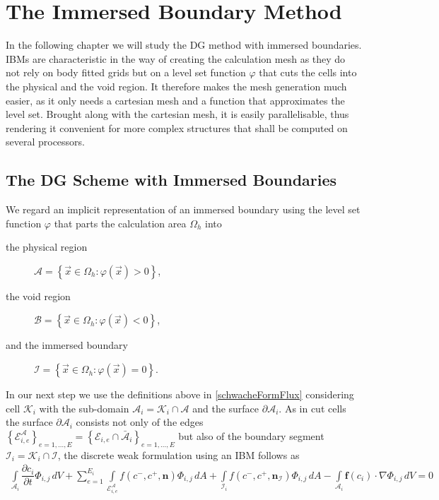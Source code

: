 \chapter{The Immersed Boundary Method}
\label{immersedBoundaries}
In the following chapter we will study the DG method with immersed boundaries. IBMs are characteristic in the way of creating the calculation mesh as they do not rely on body fitted grids but on a level set function $\varphi$ that cuts the cells into the physical and the void region. It therefore makes the mesh generation much easier, as it only needs a cartesian mesh and a function that approximates the level set. Brought along with the cartesian mesh, it is easily parallelisable, thus rendering it convenient for more complex structures that shall be computed on several processors.
	\section{The DG Scheme with Immersed Boundaries}
	We regard an implicit representation of an immersed boundary using the level set function $\varphi$ that parts the calculation area $\Omega_h$ into 
	\begin{description}
		\item[the physical region]  $\mathcal{A} = \left\{\vec{x} \in \Omega_h : \varphi (\vec{x}) > 0 \right\}$,
		\item[the void region]  $\mathcal{B} = \left\{ \vec{x}\in \Omega_h : \varphi (\vec{x}) < 0 \right\}$, 
		\item[and the immersed boundary] $\mathcal{I} = \left\{ \vec{x}\in \Omega_h : \varphi (\vec{x}) = 0 \right\}$.
	\end{description}
	In our next step we use the definitions above in \ref{schwacheFormFlux} considering cell $\mathcal{K}_i$ with the sub-domain $\mathcal{A}_i = \mathcal{K}_i \cap \mathcal{A}$ and the surface $\partial \mathcal{A}_i$. As in cut cells the surface $\partial \mathcal{A}_i$ consists not only of the edges $\left\{\mathcal{E}_{i,e}^\mathcal{A} \right\}_{e = 1, ..., E} = \left\{\mathcal{E}_{i,e} \cap \bar{\mathcal{A}}_i \right\}_{e = 1, ..., E}$ but also of the boundary segment $\mathcal{I}_i = \mathcal{K}_i \cap \mathcal{I}$, the discrete weak formulation using an IBM follows as
	\begin{align}
	\int\limits_{\mathcal{A}_i} \dfrac{\partial c_i}{\partial t}\Phi_{i,j} \, dV +
	\sum_{e=1}^{E_i}\int\limits_{\mathcal{E}_{i,e}^\mathcal{A}} f \left( c^-, c^+, \mathbf{n} \right) \Phi_{i,j} \, dA + \int\limits_{\mathcal{I}_{i}} f \left( c^-, c^+, \mathbf{n}_\mathcal{I} \right) \Phi_{i,j} \, dA - \int\limits_{\mathcal{A}_i} \boldsymbol{f}\left(c_i\right) \cdot \nabla\Phi_{i,j} \, dV = 0
	\label{schwacheFormIBM}
	\end{align}
